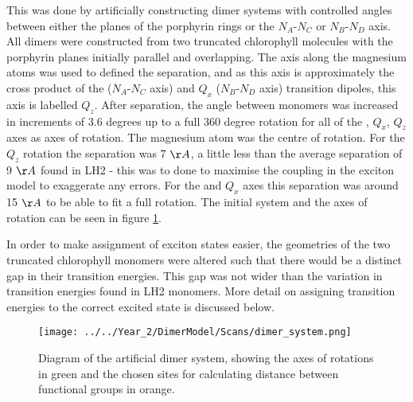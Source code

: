 This was done by artificially constructing dimer systems with controlled angles 
between either the planes of the porphyrin rings or the $N_A$-$N_C$ or $N_B$-$N_D$
axis. All dimers were constructed from two truncated chlorophyll molecules with 
the porphyrin planes initially parallel and overlapping. The axis along the magnesium
atoms was used to defined the separation, and as this axis is approximately the 
cross product of the \Qy ($N_A$-$N_C$ axis) and $Q_x$ ($N_B$-$N_D$ axis) transition
dipoles, this axis is labelled $Q_z$. After separation, the angle between monomers
was increased in increments of 3.6 degrees up to a full 360 degree rotation for 
all of the \Qy, $Q_x$, $Q_z$ axes as axes of rotation. The magnesium atom was the 
centre of rotation. For the $Q_z$ rotation the separation was 7 $\AA{}$, a little 
less than the average separation of 9 $\AA{}$ found in LH2 - this was to done to 
maximise the coupling in the exciton model to exaggerate any errors. For the \Qy
and $Q_x$ axes this separation was around 15 $\AA{}$ to be able to fit a full rotation.
The initial system and the axes of rotation can be seen in figure \ref{fig:dimer_system}.

In order to make assignment of exciton states easier, the geometries of the two 
truncated chlorophyll monomers were altered such that there would be a distinct 
gap in their transition energies. This gap was not wider than the variation in 
transition energies found in LH2 monomers. More detail on assigning transition 
energies to the correct excited state is discussed below.

\begin{figure}
    \centering
    \texttt{[image: ../../Year\_2/DimerModel/Scans/dimer\_system.png]}
    \caption{Diagram of the artificial dimer system, showing the axes of rotations
    in green and the chosen sites for calculating distance between functional groups
    in orange.}
    \label{fig:dimer_system}
\end{figure}


